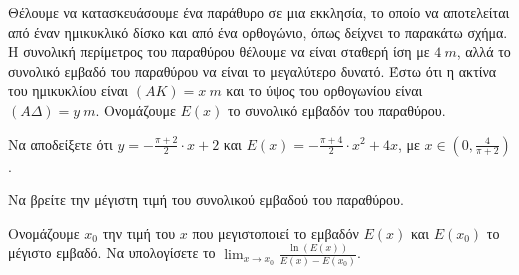 Θέλουμε να κατασκευάσουμε ένα παράθυρο σε μια εκκλησία, το οποίο να αποτελείται από έναν ημικυκλικό δίσκο και από ένα ορθογώνιο, όπως δείχνει το παρακάτω σχήμα. Η συνολική περίμετρος του παραθύρου θέλουμε να είναι σταθερή ίση με $4~m$, αλλά το συνολικό εμβαδό του παραθύρου να είναι το μεγαλύτερο δυνατό. Έστω ότι η ακτίνα του ημικυκλίου είναι $(AK) = x~m$ και το ύψος του ορθογωνίου είναι $(A\Delta) = y~m$. Ονομάζουμε $E(x)$ το συνολικό εμβαδόν του παραθύρου.
\begin{alist}
\item Να αποδείξετε ότι $y = -\frac{\pi+2}{2} \cdot x + 2$ και $E(x) = -\frac{\pi+4}{2} \cdot x^2 + 4x$, με $x \in \left(0, \frac{4}{\pi+2}\right)$. 
\item Να βρείτε την μέγιστη τιμή του συνολικού εμβαδού του παραθύρου. 
\item Ονομάζουμε $x_0$ την τιμή του $x$ που μεγιστοποιεί το εμβαδόν $E(x)$ και $E(x_0)$ το μέγιστο εμβαδό. Να υπολογίσετε το $\lim_{x\to x_0} \frac{\ln(E(x))}{E(x)-E(x_0)}$. 
\end{alist}
